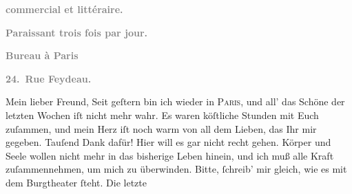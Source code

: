 \begin{ledgroupsized}[t]{13cm}
           \pstart
           \begin{otherlanguage}{french}\textcolor{gray}{\textbf{commercial et littéraire.}}\end{otherlanguage}\pend
           \pstart
           \begin{otherlanguage}{french}\textcolor{gray}{\textbf{\textbf{Paraissant trois fois par jour.}}}\end{otherlanguage}\pend
           \pstart
           \begin{otherlanguage}{french}\textcolor{gray}{\textbf{\textbf{Bureau à Paris}}}\end{otherlanguage}\pend
           \pstart
           \begin{otherlanguage}{french}\textcolor{gray}{\textbf{\textbf{24. Rue Feydeau.}}}\end{otherlanguage}\pend
           \pstart\center{}Mein lieber Freund,\pend\pstart
           Seit geſtern bin ich wieder in \textsc{Paris}, und all’ das Schöne der letzten Wochen iſt nicht mehr wahr. Es waren köſtliche
               Stunden mit Euch zuſammen, und mein Herz iſt noch warm \strikeout{\textcolor{gray}{×}} von all dem Lieben, das Ihr mir gegeben. Tauſend Dank dafür!\pend
           \pstart
           Hier will es gar nicht recht gehen. \strikeout{\textcolor{gray}{×}\-\textcolor{gray}{×}\-\textcolor{gray}{×}} Körper und Seele wollen nicht mehr in das bisherige Leben hinein, und ich muß
               alle Kraft zuſammennehmen, um mich zu überwinden.\pend
           \pstart
           {\pb}Bitte, ſchreib’ mir gleich, wie es mit dem Burgtheater ſteht. Die letzte \label{K_L02747-1v}
\end{ledgroupsized}
